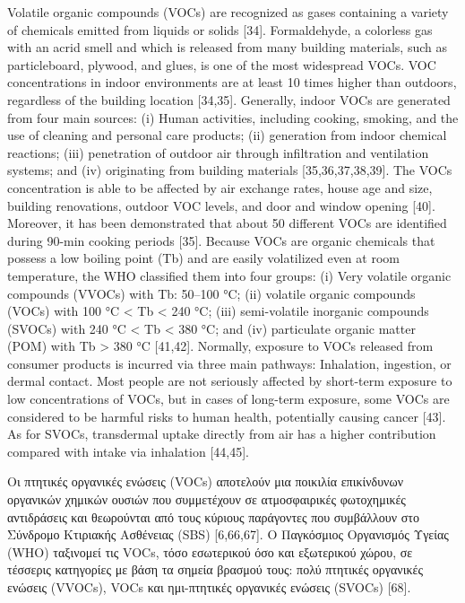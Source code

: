 Volatile organic compounds (VOCs) are recognized as gases containing a variety of chemicals emitted from liquids or solids [34]. Formaldehyde, a colorless gas with an acrid smell and which is released from many building materials, such as particleboard, plywood, and glues, is one of the most widespread VOCs. VOC concentrations in indoor environments are at least 10 times higher than outdoors, regardless of the building location [34,35]. Generally, indoor VOCs are generated from four main sources: (i) Human activities, including cooking, smoking, and the use of cleaning and personal care products; (ii) generation from indoor chemical reactions; (iii) penetration of outdoor air through infiltration and ventilation systems; and (iv) originating from building materials [35,36,37,38,39]. The VOCs concentration is able to be affected by air exchange rates, house age and size, building renovations, outdoor VOC levels, and door and window opening [40]. Moreover, it has been demonstrated that about 50 different VOCs are identified during 90-min cooking periods [35]. Because VOCs are organic chemicals that possess a low boiling point (Tb) and are easily volatilized even at room temperature, the WHO classified them into four groups: (i) Very volatile organic compounds (VVOCs) with Tb: 50–100 °C; (ii) volatile organic compounds (VOCs) with 100 °C < Tb < 240 °C; (iii) semi-volatile inorganic compounds (SVOCs) with 240 °C < Tb < 380 °C; and (iv) particulate organic matter (POM) with Tb > 380 °C [41,42]. Normally, exposure to VOCs released from consumer products is incurred via three main pathways: Inhalation, ingestion, or dermal contact. Most people are not seriously affected by short-term exposure to low concentrations of VOCs, but in cases of long-term exposure, some VOCs are considered to be harmful risks to human health, potentially causing cancer [43]. As for SVOCs, transdermal uptake directly from air has a higher contribution compared with intake via inhalation [44,45].

\cite{ijerph17082927}

Οι πτητικές οργανικές ενώσεις (VOCs) αποτελούν μια ποικιλία επικίνδυνων οργανικών χημικών ουσιών που συμμετέχουν σε ατμοσφαιρικές φωτοχημικές αντιδράσεις και θεωρούνται από τους κύριους παράγοντες που συμβάλλουν στο Σύνδρομο Κτιριακής Ασθένειας (SBS) [6,66,67]. Ο Παγκόσμιος Οργανισμός Υγείας (WHO) ταξινομεί τις VOCs, τόσο εσωτερικού όσο και εξωτερικού χώρου, σε τέσσερις κατηγορίες με βάση τα σημεία βρασμού τους: πολύ πτητικές οργανικές ενώσεις (VVOCs), VOCs και ημι-πτητικές οργανικές ενώσεις (SVOCs) [68].

